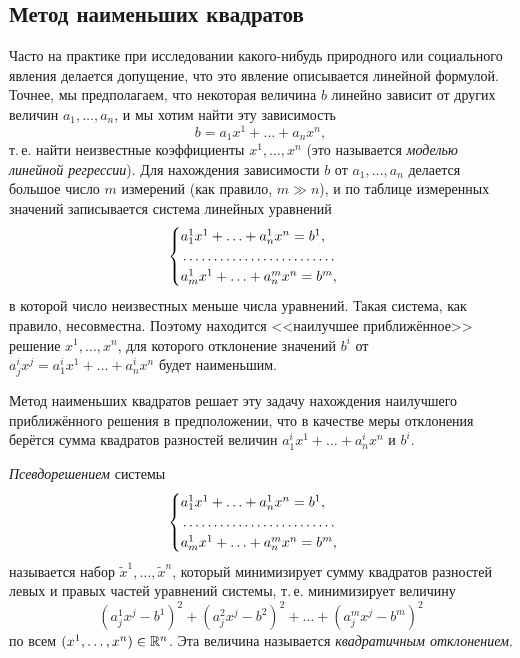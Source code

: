 \subsection{Метод наименьших квадратов}

\setcounter{definition}{0}
\setcounter{proposal}{0}
\setcounter{lemma}{0}
\setcounter{theorem}{0}

Часто на практике при исследовании какого-нибудь природного или социального явления делается допущение, что это явление описывается линейной формулой. Точнее, мы предполагаем, что некоторая величина $b$ линейно зависит от других величин $a_1, \ldots, a_n$, и мы хотим найти эту зависимость
\[
    b = a_1x^1 + \ldots + a_nx^n,
\]
т.\,е. найти неизвестные коэффициенты $x^1, \ldots, x^n$ (это называется \textit{моделью линейной регрессии}). Для нахождения зависимости $b$ от $a_1, \ldots, a_n$ делается большое число $m$ измерений (как правило, $m \gg n$), и по таблице измеренных значений записывается система линейных уравнений
\[
    \begin{cases}
        a_1^1x^1 + \ldots + a^1_nx^n = b^1,\\
        \dotfill\\
        a_m^1x^1 + \ldots + a^m_nx^n = b^m,
    \end{cases}
\]
в которой число неизвестных меньше числа уравнений. Такая система, как правило, несовместна. Поэтому находится <<наилучшее приближённое>> решение $x^1, \ldots, x^n$, для которого отклонение значений $b^i$ от $a_j^ix^j = a^i_1x^1 + \ldots + a^i_nx^n$ будет наименьшим.

Метод наименьших квадратов решает эту задачу нахождения наилучшего приближённого решения в предположении, что в качестве меры отклонения берётся сумма квадратов разностей величин $a^i_1x^1 + \ldots + a^i_nx^n$ и $b^i$.

\begin{definition}
    \textit{Псевдорешением} системы
    \[
        \begin{cases}
            a_1^1x^1 + \ldots + a^1_nx^n = b^1,\\
            \dotfill\\
            a_m^1x^1 + \ldots + a^m_nx^n = b^m,
        \end{cases}
    \]
    называется набор $\widetilde{x}^1, \ldots, \widetilde{x}^n$, который минимизирует сумму квадратов разностей левых и правых частей уравнений системы, т.\,е. минимизирует величину
    \[
        (a^1_jx^j - b^1)^2 + (a^2_jx^j - b^2)^2 + \ldots + (a^m_jx^j - b^m)^2
    \]
    по всем $(x^1, \ldots, x^n) \in \mathbb{R}^n$. Эта величина называется \textit{квадратичным отклонением}.
\end{definition}


